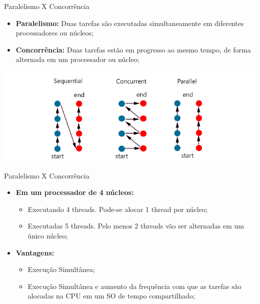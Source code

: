 \documentclass[10pt]{beamer}
\begin{document}
\begin{frame}{Paralelismo X Concorrência}
	\begin{itemize}
		\item \textbf{Paralelismo:} Duas tarefas são executadas simultaneamente em diferentes processadores ou núcleos;
		\vspace{0.2cm}
		\item \textbf{Concorrência:} Duas tarefas estão em progresso ao mesmo tempo, de forma alternada em um processador ou núcleo;
	\end{itemize}
	\includegraphics[width=\textwidth]{imgs/compare}
\end{frame}

\begin{frame}{Paralelismo X Concorrência}
	\begin{itemize}
		\item \textbf{Em um processador de 4 núcleos:}
		\begin{itemize}
			\item Executando 4 threads. Pode-se alocar 1 thread por núcleo;
			\vspace{0.2cm}
			\item Executadas 5 threads. Pelo menos 2 threads vão ser alternadas em um único núcleo;
		\end{itemize}
	\end{itemize}
	\begin{itemize}
		\item \textbf{Vantagens:}
		\begin{itemize}
			\item Execução Simultânea;
			\vspace{0.2cm}
			\item Execução Simultânea e aumento da frequência com que as tarefas são alocadas na CPU em um SO de tempo compartilhado;
		\end{itemize}
	\end{itemize}
\end{frame}
\end{document}
